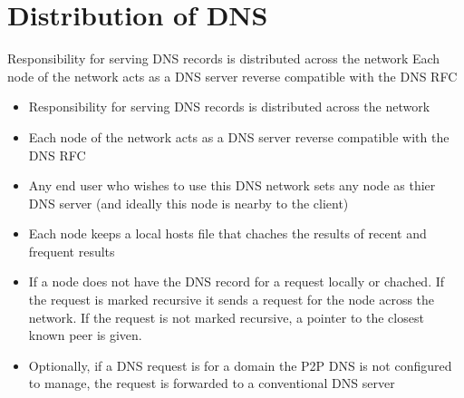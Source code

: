\documentclass{IEEEtran}
\begin{document}
\section{Distribution of DNS}
Responsibility for serving DNS records is distributed across the network
Each node of the network acts as a DNS server reverse compatible with the DNS RFC
\begin{itemize}
\item{Responsibility for serving DNS records is distributed across the network}
\item{Each node of the network acts as a DNS server reverse compatible with the DNS RFC}
\item{Any end user who wishes to use this DNS network sets any node as thier DNS server (and ideally this node is nearby to the client)}
\item{Each node keeps a local hosts file that chaches the results of recent and frequent results}
\item{If a node does not have the DNS record for a request locally or chached. If the request is marked recursive it sends a request for the node across the network. If the request is not marked recursive, a pointer to the closest known peer is given.}
\item{Optionally, if a DNS request is for a domain the P2P DNS is not configured to manage, the request is forwarded to a conventional DNS server}
\end{itemize}
\end{document}
